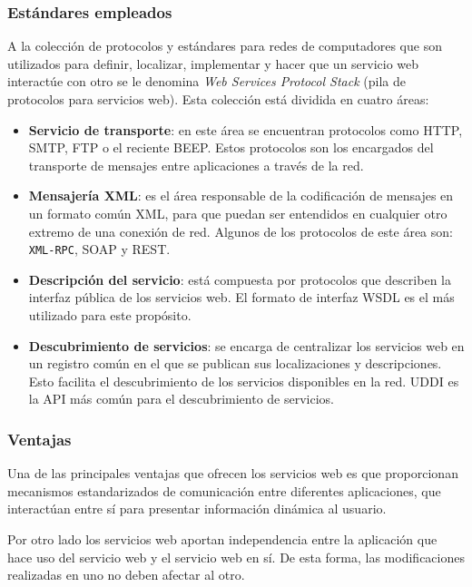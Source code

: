   \subsubsection{Estándares empleados}
A la colección de protocolos y estándares para redes de computadores que son
utilizados para definir, localizar, implementar y hacer que un servicio web
interactúe con otro se le denomina \emph{Web Services Protocol Stack} (pila
de protocolos para servicios web). Esta colección está dividida en cuatro
áreas:
\begin{itemize}
\item \textbf{Servicio de transporte}: en este área se encuentran protocolos
como \acs{HTTP}, \acs{SMTP}, \acs{FTP} o el reciente \acs{BEEP}. Estos
protocolos son los encargados del transporte de mensajes entre aplicaciones
a través de la red.
\item \textbf{Mensajería \acs{XML}}: es el área responsable de la codificación
de mensajes en un formato común \acs{XML}, para que puedan ser entendidos
en cualquier otro extremo de una conexión de red. Algunos de los protocolos
de este área son: \texttt{XML-RPC}, \acs{SOAP} y \acs{REST}.
\item \textbf{Descripción del servicio}: está compuesta por protocolos que
describen la interfaz pública de los servicios web. El formato de interfaz
\acs{WSDL} es el más utilizado para este propósito.
\item \textbf{Descubrimiento de servicios}: se encarga de centralizar los
servicios web en un registro común en el que se publican sus localizaciones
y descripciones. Esto facilita el descubrimiento de los servicios disponibles
en la red. \acs{UDDI} es la \acs{API} más común para el descubrimiento de 
servicios.
\end{itemize}

  \subsubsection{Ventajas}

Una de las principales ventajas que ofrecen los servicios web es que 
proporcionan mecanismos estandarizados de comunicación entre diferentes
aplicaciones, que interactúan entre sí para presentar información dinámica al 
usuario.

Por otro lado los servicios web aportan independencia entre la 
aplicación que hace uso del servicio web y el servicio web en sí. De esta 
forma, las modificaciones realizadas en uno no deben afectar al otro.

